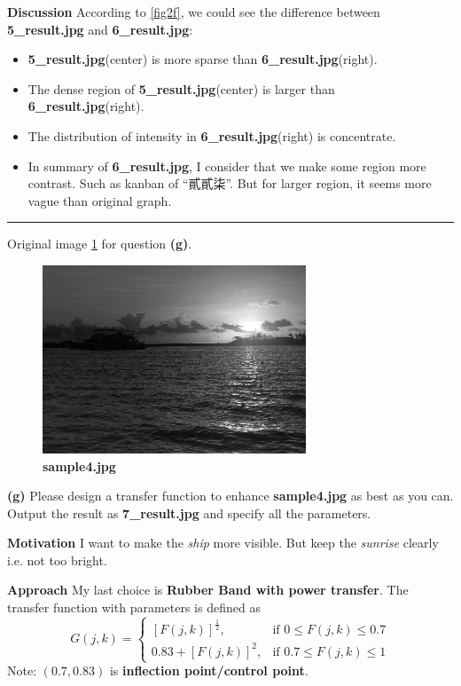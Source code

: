 \textbf{Discussion}
According to \cref{fig2f}, we could see the \alert{difference} between \textbf{5\_result.jpg} and \textbf{6\_result.jpg}:
\begin{itemize}
\tightlist
\item \textbf{5\_result.jpg}(center) is more \alert{sparse} than \textbf{6\_result.jpg}(right).
\item The dense region of \textbf{5\_result.jpg}(center) is larger than \textbf{6\_result.jpg}(right).
\item The distribution of intensity in \textbf{6\_result.jpg}(right) is \alert{concentrate}.
\item In summary of \textbf{6\_result.jpg}, I consider that we make some region more contrast. Such as kanban of ``貳貳柒''. But for larger region, it seems more vague than original graph.
\end{itemize}

\rule{\textwidth}{.5mm}
Original image \cref{fig2_2} for question \textbf{(g)}.
\begin{figure}
    \centering
    \includegraphics[width=0.7\textwidth]{image/sample4.jpg}
    \caption{\textbf{sample4.jpg}}
    \label{fig2_2}
\end{figure}

\textbf{(g)} Please design a transfer function to enhance \textbf{sample4.jpg} as best as you can. Output the result as \textbf{7\_result.jpg} and specify all the parameters.

\textbf{Motivation}
I want to make the \textit{ship} more visible. But keep the \textit{sunrise} clearly i.e. not too bright.

\textbf{Approach}
My last choice is \textbf{Rubber Band with power transfer}.
The transfer function with parameters is defined as
\begin{equation}
  G(j, k) = 
  \begin{cases}
    \left[F(j, k) \right]^{ \frac{1}{2} },& \text{if } 0 \leq F(j, k) \leq 0.7 \\
    0.83 + \left[F(j, k) \right]^{2},& \text{if } 0.7 \leq F(j, k) \leq 1
  \end{cases}
\end{equation}
Note: \((0.7, 0.83)\) is \textbf{inflection point/control point}.

